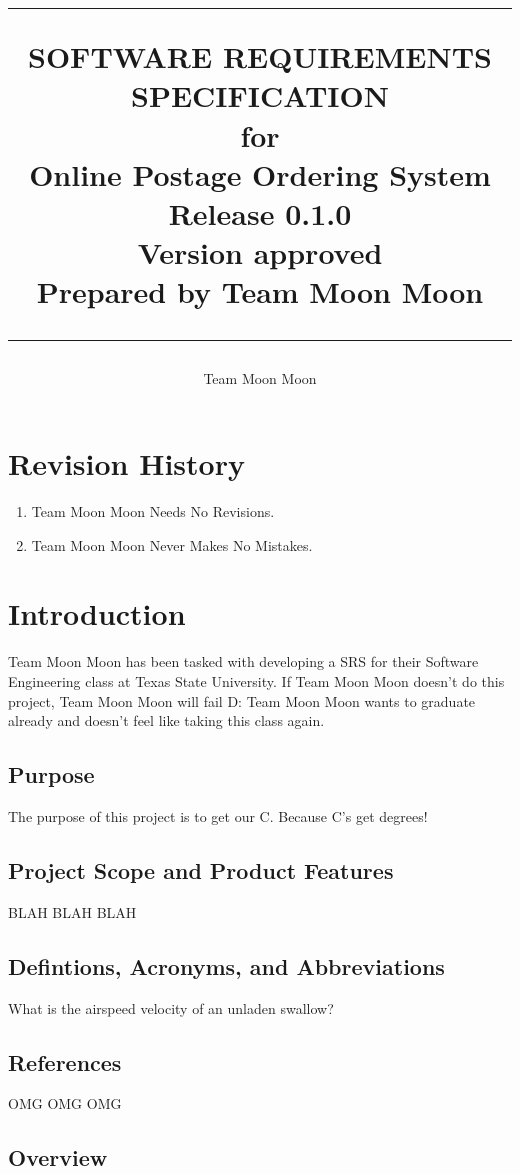 \documentclass{scrreprt}
\title{%
\flushright
\rule{16cm}{5pt}\vskip1cm
\Huge{SOFTWARE REQUIREMENTS\\ SPECIFICATION}\\
\vspace{2cm}
for\\
\vspace{2cm}
Online Postage Ordering System\\
\vspace{2cm}
\LARGE{Release 0.1.0\\}
\vspace{2cm}
\LARGE{Version \myversion approved\\}
\vspace{2cm}
Prepared by Team Moon Moon\\
\vfill
\rule{16cm}{5pt}
}
\date{}
\author{Team Moon Moon}
\begin{document}
\maketitle
\tableofcontents

\chapter*{Revision History}

\begin{enumerate}
\item Team Moon Moon Needs No Revisions.
\item Team Moon Moon Never Makes No Mistakes.
\end{enumerate}

\chapter{Introduction}

Team Moon Moon has been tasked with developing a SRS for their Software 
Engineering class at Texas State University. If Team Moon Moon doesn't do 
this project, Team Moon Moon will fail D: Team Moon Moon wants to 
graduate already and doesn't feel like taking this class again.

\section{Purpose}

The purpose of this project is to get our C. Because C's get degrees!

\section{Project Scope and Product Features}

BLAH BLAH BLAH

\section{Defintions, Acronyms, and Abbreviations}

What is the airspeed velocity of an unladen swallow?

\section{References}

OMG OMG OMG

\section{Overview}
\end{document}
